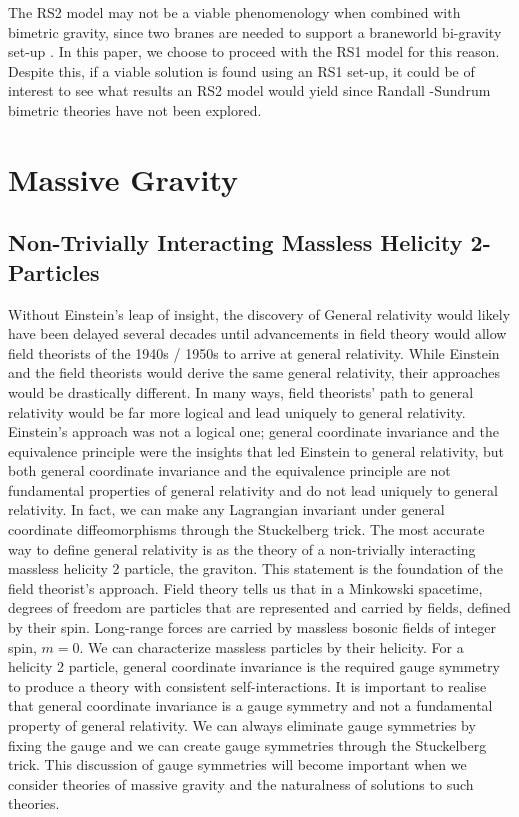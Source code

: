 \documentclass[11pt]{report}
\numberwithin{equation}{chapter}
\begin{document}
\noindent The RS2 model may not be a viable phenomenology when combined with bimetric gravity, since two branes are needed to support a braneworld bi-gravity set-up \cite{Kaloper:2018dqn}. In this paper, we choose to proceed with the RS1 model for this reason. Despite this, if a viable solution is found using an RS1 set-up, it could be of interest to see what results an RS2 model would yield since Randall -Sundrum bimetric theories have not been explored. 

\chapter{Massive Gravity}
\section{Non-Trivially Interacting Massless Helicity 2-Particles}
Without Einstein's leap of insight, the discovery of General relativity would likely have been delayed several decades until advancements in field theory would allow field theorists of the 1940s / 1950s to arrive at general relativity.
While Einstein and the field theorists would derive the same general relativity, their approaches would be drastically different. In many ways, field theorists' path to general relativity would be far more logical and lead uniquely to general relativity. Einstein's approach was not a logical one; general coordinate invariance and the equivalence principle were the insights that led Einstein to general relativity, but both general coordinate invariance and the equivalence principle are not fundamental properties of general relativity and do not lead uniquely to general relativity. In fact, we can make any Lagrangian invariant under general coordinate diffeomorphisms through the Stuckelberg trick.
The most accurate way to define general relativity is as the theory of a non-trivially interacting massless helicity 2 particle, the graviton. This statement is the foundation of the field theorist's approach. 
Field theory tells us that in a Minkowski spacetime, degrees of freedom are particles that are represented and carried by fields, defined by their spin. Long-range forces are carried by massless bosonic fields of integer spin, $m=0$. We can characterize massless particles by their helicity. For a helicity 2 particle, general coordinate invariance is the required gauge symmetry to produce a theory with consistent self-interactions. It is important to realise that general coordinate invariance is a gauge symmetry and not a fundamental property of general relativity. We can always eliminate gauge symmetries by fixing the gauge and we can create gauge symmetries through the Stuckelberg trick. This discussion of gauge symmetries will become important when we consider theories of massive gravity and the naturalness of solutions to such theories.
\end{document}
